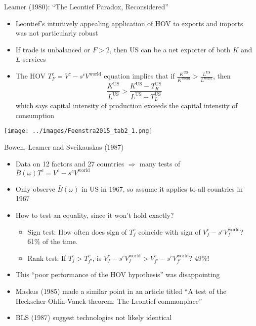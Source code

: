 \documentclass[10pt,notes=hide]{beamer}
\begin{document}
\begin{frame}{Leamer (1980): ``The Leontief Paradox, Reconsidered''}
\begin{itemize}
	\item Leontief's intuitively appealing application of HOV to exports and imports was not particularly robust
	\item If trade is unbalanced or $F>2$, then US can be a net exporter of both $K$ and $L$ services
	\item The HOV $T_{F}^{c} = V^c - s^c V^{\text{world}}$ equation implies that
	if $\frac{K^{\text{US}}}{K^{\text{world}}} > \frac{L^{\text{US}}}{L^{\text{world}}}$, then
	\begin{equation*}
		\frac{K^{\text{US}}}{L^{\text{US}}} > \frac{K^{\text{US}} - T_K^{\text{US}}}{L^{\text{US}} - T_L^{\text{US}}} 
	\end{equation*}
	which says capital intensity of production exceeds the capital intensity of consumption
\end{itemize}
\texttt{[image: ../images/Feenstra2015\_tab2\_1.png]}
\end{frame}
\begin{frame}{Bowen, Leamer and Sveikauskas (1987)}
\begin{itemize}
	\item Data on 12 factors and 27 countries $\Rightarrow$ many tests of $\bar{B}(\omega) T^c  = V^c - s^c V^{\text{world}}$
	\item Only observe $\bar{B}(\omega)$ in US in 1967, so assume it applies to all countries in 1967
	\item How to test an equality, since it won't hold exactly?
	\begin{itemize}
		\item Sign test: How often does sign of $T_{f}^{c}$ coincide with sign of $V_f^c - s^c V_f^{\text{world}}$? 61\% of the time.
		\item Rank test: If $T_{f}^{c} > T_{f'}^{c}$, is $V_{f}^c - s^c V_{f}^{\text{world}} > V_{f'}^c - s^c V_{f'}^{\text{world}}$? 49\%!
	\end{itemize}
	\item This ``poor performance of the HOV hypothesis'' was disappointing
	\item Maskus (1985) made a similar point in an article titled ``A test of the Heckscher-Ohlin-Vanek theorem: The Leontief commonplace''
	\item BLS (1987) suggest technologies not likely identical
\end{itemize}
\end{frame}
\end{document}
